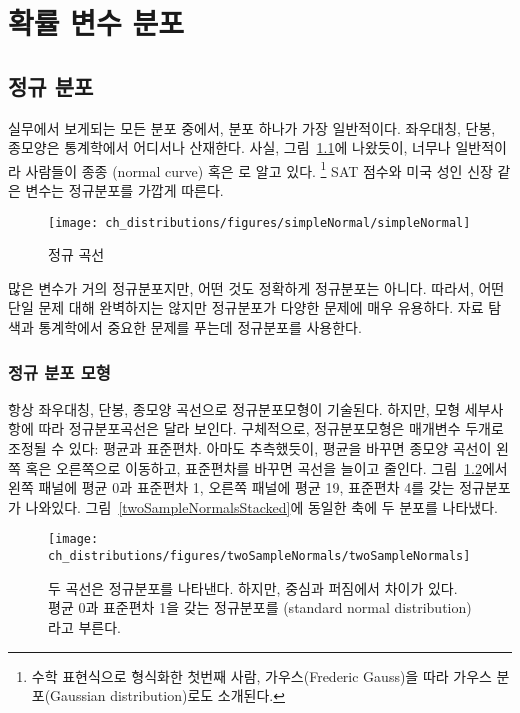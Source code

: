 \chapter{확률 변수 분포}
\label{modeling}


\section{정규 분포}
\label{normalDist}

실무에서 보게되는 모든 분포 중에서, 분포 하나가 가장 일반적이다. 좌우대칭, 단봉, 종모양은 통계학에서 어디서나 산재한다. 사실, 그림~\ref{simpleNormal}에 나왔듯이, 너무나 일반적이라 사람들이 종종 (normal curve) 혹은 로 알고 있다.
\footnote{수학 표현식으로 형식화한 첫번째 사람, 가우스(Frederic Gauss)을 따라 가우스 분포(Gaussian distribution)로도 소개된다.}
SAT 점수와 미국 성인 신장 같은 변수는 정규분포를 가깝게 따른다.

\begin{figure}
\centering
\texttt{[image: ch\_distributions/figures/simpleNormal/simpleNormal]}
\caption{정규 곡선}
\label{simpleNormal}
\end{figure}

\begin{termBox}{
많은 변수가 거의 정규분포지만, 어떤 것도 정확하게 정규분포는 아니다. 따라서, 어떤 단일 문제 대해 완벽하지는 않지만 정규분포가 다양한 문제에 매우 유용하다. 자료 탐색과 통계학에서 중요한 문제를 푸는데 정규분포를 사용한다.\vspace{0.7mm}}
\end{termBox}


\subsection{정규 분포 모형}

항상 좌우대칭, 단봉, 종모양 곡선으로 정규분포모형이 기술된다. 하지만, 모형 세부사항에 따라 정규분포곡선은 달라 보인다. 구체적으로, 정규분포모형은 매개변수 두개로 조정될 수 있다: 평균과 표준편차. 아마도 추측했듯이, 평균을 바꾸면 종모양 곡선이 왼쪽 혹은 오른쪽으로 이동하고, 표준편차를 바꾸면 곡선을 늘이고 줄인다. 그림~\ref{twoSampleNormals}에서 왼쪽 패널에 평균 0과 표준편차 1, 오른쪽 패널에 평균 19, 표준편차 4를 갖는 정규분포가 나와있다. 그림~\ref{twoSampleNormalsStacked}에 동일한 축에 두 분포를 나타냈다.

\begin{figure}[hht]
\centering
\texttt{[image: ch\_distributions/figures/twoSampleNormals/twoSampleNormals]}
\caption{두 곡선은 정규분포를 나타낸다. 하지만, 중심과 퍼짐에서 차이가 있다. 평균 0과 표준편차 1을 갖는 정규분포를 (standard normal distribution)라고 부른다.}
\label{twoSampleNormals}
\end{figure}

